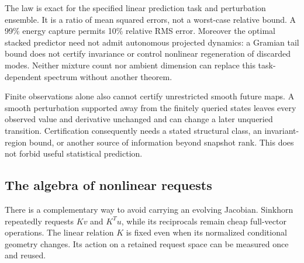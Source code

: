 \documentclass[journal]{IEEEtran}
\theoremstyle{definition}
\begin{document}
The law is exact for the specified linear prediction task and perturbation
ensemble. It is a ratio of mean squared errors, not a worst-case relative
bound. A 99\% energy capture permits 10\% relative RMS error. Moreover the
optimal stacked predictor need not admit autonomous projected dynamics:
a Gramian tail bound does not certify invariance or control nonlinear
regeneration of discarded modes. Neither mixture count nor ambient dimension
can replace this task-dependent spectrum without another theorem.

Finite observations alone also cannot certify unrestricted smooth future
maps. A smooth perturbation supported away from the finitely queried states
leaves every observed value and derivative unchanged and can change a later
unqueried transition. Certification consequently needs a stated structural
class, an invariant-region bound, or another source of information beyond
snapshot rank. This does not forbid useful statistical prediction.

\subsection{The algebra of nonlinear requests}
There is a complementary way to avoid carrying an evolving Jacobian.
Sinkhorn repeatedly requests $Kv$ and $K^Tu$, while its reciprocals remain
cheap full-vector operations. The linear relation $K$ is fixed even when
its normalized conditional geometry changes. Its action on a retained
request space can be measured once and reused.
\end{document}

